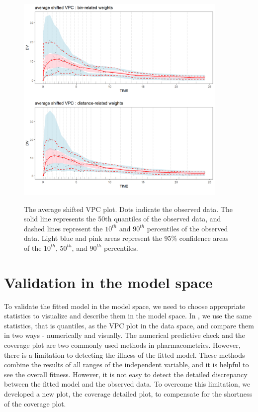 \begin{figure}
\caption{The average shifted VPC plot. Dots indicate the observed data. The solid line represents the 50th quantiles of the observed data, and dashed lines represent the $10^{th}$ and $90^{th}$ percentiles of the observed data. Light blue and pink areas represent the 95\% confidence areas of the $10^{th}$, $50^{th}$, and $90^{th}$ percentiles.}
\centering
\includegraphics[width=4in,height=4in]{plotPNG/Fig3-1.png}
\label{Fig3}
\end{figure}

\hypertarget{MS}{%
\section{Validation in the model space}\label{MS}}

To validate the fitted model in the model space, we need to choose appropriate statistics to visualize and describe them in the model space. In , we use the same statistics, that is quantiles, as the VPC plot in the data space, and compare them in two ways - numerically and visually. The numerical predictive check and the coverage plot are two commonly used methods in pharmacometrics. However, there is a limitation to detecting the illness of the fitted model. These methods combine the results of all ranges of the independent variable, and it is helpful to see the overall fitness. However, it is not easy to detect the detailed discrepancy between the fitted model and the observed data. To overcome this limitation, we developed a new plot, the coverage detailed plot, to compensate for the shortness of the coverage plot.

